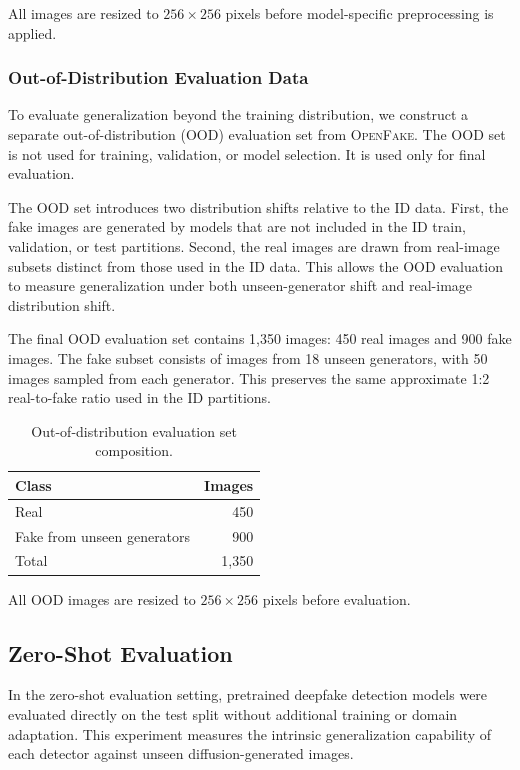 All images are resized to $256 \times 256$ pixels before model-specific preprocessing is applied.

\subsubsection{Out-of-Distribution Evaluation Data}
\label{subsubsec:ood-data}

To evaluate generalization beyond the training distribution, we construct a separate out-of-distribution (OOD) evaluation set from \textsc{OpenFake}. The OOD set is not used for training, validation, or model selection. It is used only for final evaluation.

The OOD set introduces two distribution shifts relative to the ID data. First, the fake images are generated by models that are not included in the ID train, validation, or test partitions. Second, the real images are drawn from real-image subsets distinct from those used in the ID data. This allows the OOD evaluation to measure generalization under both unseen-generator shift and real-image distribution shift.

The final OOD evaluation set contains 1,350 images: 450 real images and 900 fake images. The fake subset consists of images from 18 unseen generators, with 50 images sampled from each generator. This preserves the same approximate 1:2 real-to-fake ratio used in the ID partitions.

\begin{table}[t]
\centering
\caption{Out-of-distribution evaluation set composition.}
\label{tab:ood-composition}
\begin{tabular}{l r}
\hline
Class & Images \\
\hline
Real & 450 \\
Fake from unseen generators & 900 \\
\hline
Total & 1,350 \\
\hline
\end{tabular}
\end{table}

All OOD images are resized to $256 \times 256$ pixels before evaluation.

\subsection{Zero-Shot Evaluation}
\label{subsec:zero-shot-eval}
In the zero-shot evaluation setting, pretrained deepfake detection models were evaluated directly on the test split without additional training or domain adaptation. This experiment measures the intrinsic generalization capability of each detector against unseen diffusion-generated images.

